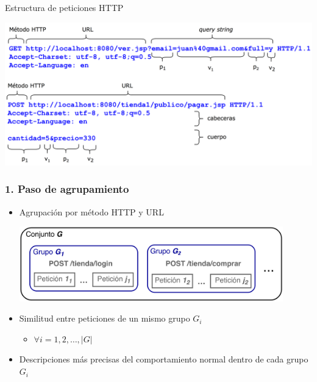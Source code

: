 \begin{frame}
    \begin{exampleblock}{Estructura de peticiones HTTP}
        \begin{flushleft}
            \includegraphics[width=\textwidth]{images/http-request-structure.png}
        \end{flushleft}
    \end{exampleblock}
\end{frame}

\begin{frame}
    \frametitle{1. Paso de agrupamiento}

    \begin{itemize}[<2->]
        \item
        Agrupación por método HTTP y URL

        \begin{flushleft}
            \includegraphics[width=0.9\textwidth]{images/request-groups.png}
        \end{flushleft}

        \item
        Similitud entre peticiones de un mismo grupo $G_{i}$

        \begin{itemize}[<.->]
            \item
            $ \forall i = 1, 2, \dots , \lvert G \rvert $
        \end{itemize}

        \item
        Descripciones más precisas del comportamiento normal dentro de
        cada grupo $G_{i}$
    \end{itemize}
\end{frame}

